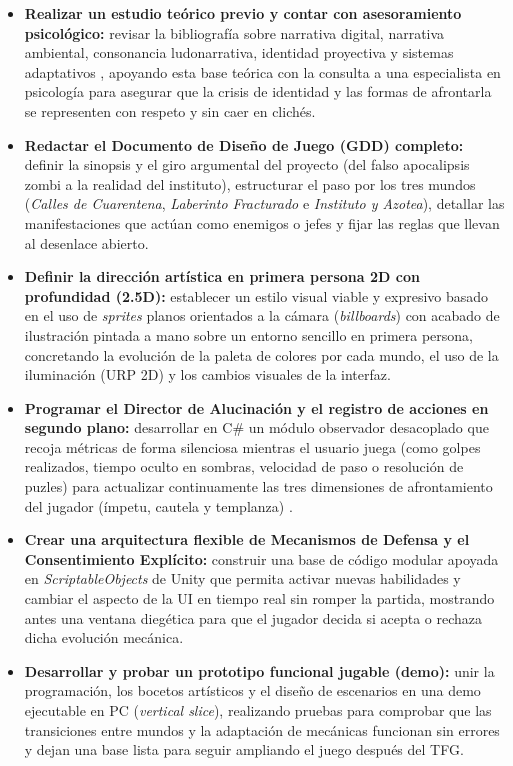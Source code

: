 \begin{itemize}
  \item \textbf{Realizar un estudio teórico previo y contar con asesoramiento psicológico:} revisar la bibliografía sobre narrativa digital, narrativa ambiental, consonancia ludonarrativa, identidad proyectiva y sistemas adaptativos \parencite{finestrat2018, hernandez2024, gomez2026, tremblay2010}, apoyando esta base teórica con la consulta a una especialista en psicología para asegurar que la crisis de identidad y las formas de afrontarla se representen con respeto y sin caer en clichés.
  \item \textbf{Redactar el Documento de Diseño de Juego (\ac{GDD}) completo:} definir la sinopsis y el giro argumental del proyecto (del falso apocalipsis zombi a la realidad del instituto), estructurar el paso por los tres mundos (\textit{Calles de Cuarentena}, \textit{Laberinto Fracturado} e \textit{Instituto y Azotea}), detallar las manifestaciones que actúan como enemigos o jefes y fijar las reglas que llevan al desenlace abierto.
  \item \textbf{Definir la dirección artística en primera persona \ac{2D} con profundidad (2.5D):} establecer un estilo visual viable y expresivo basado en el uso de \textit{sprites} planos orientados a la cámara (\textit{billboards}) con acabado de ilustración pintada a mano sobre un entorno sencillo en primera persona, concretando la evolución de la paleta de colores por cada mundo, el uso de la iluminación (\ac{URP} 2D) y los cambios visuales de la interfaz.
  \item \textbf{Programar el Director de Alucinación y el registro de acciones en segundo plano:} desarrollar en C\# un módulo observador desacoplado que recoja métricas de forma silenciosa mientras el usuario juega (como golpes realizados, tiempo oculto en sombras, velocidad de paso o resolución de puzles) para actualizar continuamente las tres dimensiones de afrontamiento del jugador (ímpetu, cautela y templanza) \parencite{renderhub2023}.
  \item \textbf{Crear una arquitectura flexible de Mecanismos de Defensa y el Consentimiento Explícito:} construir una base de código modular apoyada en \textit{ScriptableObjects} de Unity que permita activar nuevas habilidades y cambiar el aspecto de la \ac{UI} en tiempo real sin romper la partida, mostrando antes una ventana diegética para que el jugador decida si acepta o rechaza dicha evolución mecánica.
  \item \textbf{Desarrollar y probar un prototipo funcional jugable (demo):} unir la programación, los bocetos artísticos y el diseño de escenarios en una demo ejecutable en PC (\textit{vertical slice}), realizando pruebas para comprobar que las transiciones entre mundos y la adaptación de mecánicas funcionan sin errores y dejan una base lista para seguir ampliando el juego después del \ac{TFG}.
\end{itemize}